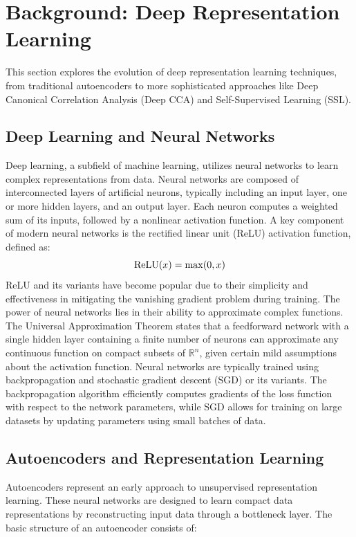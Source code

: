 \section{Background: Deep Representation Learning}

This section explores the evolution of deep representation learning techniques, from traditional autoencoders to more sophisticated approaches like Deep Canonical Correlation Analysis (Deep CCA) and Self-Supervised Learning (SSL).

\subsection{Deep Learning and Neural Networks}
Deep learning, a subfield of machine learning, utilizes neural networks to learn complex representations from data. Neural networks are composed of interconnected layers of artificial neurons, typically including an input layer, one or more hidden layers, and an output layer. Each neuron computes a weighted sum of its inputs, followed by a nonlinear activation function.
A key component of modern neural networks is the rectified linear unit (ReLU) activation function, defined as:
\begin{equation}
\operatorname{ReLU}(x) = \max(0, x)
\end{equation}
ReLU and its variants have become popular due to their simplicity and effectiveness in mitigating the vanishing gradient problem during training.
The power of neural networks lies in their ability to approximate complex functions. 
The Universal Approximation Theorem \citep{cybenko1989approximation} states that a feedforward network with a single hidden layer containing a finite number of neurons can approximate any continuous function on compact subsets of $\mathbb{R}^n$, given certain mild assumptions about the activation function.
Neural networks are typically trained using backpropagation and stochastic gradient descent (SGD) or its variants. The backpropagation algorithm efficiently computes gradients of the loss function with respect to the network parameters, while SGD allows for training on large datasets by updating parameters using small batches of data.
\subsection{Autoencoders and Representation Learning}
Autoencoders represent an early approach to unsupervised representation learning. These neural networks are designed to learn compact data representations by reconstructing input data through a bottleneck layer. The basic structure of an autoencoder consists of:

